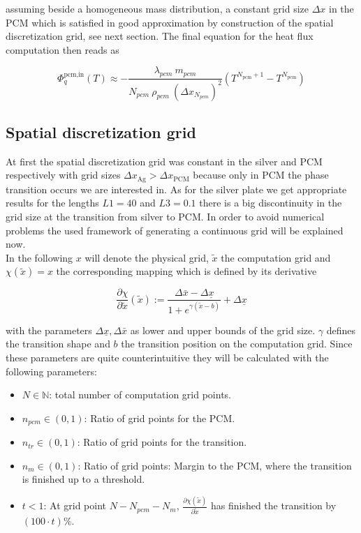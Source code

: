 \documentclass{scrartcl}[12pt, halfparskip]
\numberwithin{equation}{section}
\numberwithin{figure}{section}
\numberwithin{table}{section}
\begin{document}
assuming beside a homogeneous mass distribution, a constant grid size $\Delta x$ in the PCM which is satisfied in good approximation by construction of the spatial discretization grid, see next section. The final equation for the heat flux computation then reads as

\begin{equation}
	\varPhi_{q}^{\text{pcm,in}}(T) \approx - \frac{\lambda_{pcm} \ m_{pcm}}{N_{pcm} \ \rho_{pcm} \ (\Delta x_{N_{pcm}})^2} \left( T^{N_{\text{pcm}}+1} - T^{N_{\text{pcm}}} \right)
	\label{eq:heat_flux_computation_final}
\end{equation}


\subsection{Spatial discretization grid}
\label{sec:spatial_discretization_grid}
At first the spatial discretization grid was constant in the silver and PCM respectively with grid sizes $\Delta x_{\text{Ag}} > \Delta x_{\text{PCM}}$ because only in PCM the phase transition occurs we are interested in. As for the silver plate we get appropriate results for the lengths $L1=40$ and $L3=0.1$ there is a big discontinuity in the grid size at the transition from silver to PCM. In order to avoid numerical problems the used framework of generating a continuous grid will be explained now. \\
In the following $x$ will denote the physical grid, $\tilde{x}$ the computation grid and $\chi(\tilde{x}) = x$ the corresponding mapping which is defined by its derivative

\begin{equation}
	\frac{\partial \chi}{\partial \tilde{x}}(\tilde{x}) := \frac{\Delta \bar{x} - \Delta \underline{x}}{1 + e^{\gamma(\tilde{x} - b)}} + \Delta \underline{x}
\end{equation}

with the parameters $\Delta \underline{x}, \Delta \bar{x}$ as lower and upper bounds of the grid size. $\gamma$ defines the transition shape and $b$ the transition position on the computation grid. Since these parameters are quite counterintuitive they will be calculated with the following parameters:

\begin{itemize}
	\item $N \in \mathbb{N}$: total number of computation grid points.
	\item $n_{pcm} \in (0,1)$: Ratio of grid points for the PCM.
	\item $n_{tr} \in (0,1)$: Ratio of grid points for the transition.
	\item $n_{m} \in (0,1)$: Ratio of grid points: Margin to the PCM, where the transition is finished up to a threshold.
	\item $t < 1$: At grid point $N-N_{pcm}-N_m$, $\frac{\partial \chi(\tilde{x})}{\partial \tilde{x}}$ has finished the transition by $(100 \cdot t)\%$.
\end{itemize}
\end{document}
